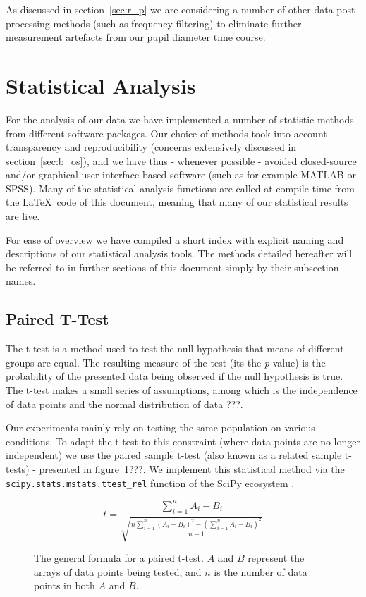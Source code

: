 	    As discussed in section~\ref{sec:r_p} we are considering a number of other data post-processing methods (such as frequency filtering) to eliminate further measurement artefacts from our pupil diameter time course. 
    \section{Statistical Analysis}\label{sec:m_sa}
	For the analysis of our data we have implemented a number of statistic methods from different software packages.
	Our choice of methods took into account transparency and reproducibility (concerns extensively discussed in section~\ref{sec:b_os}), and we have thus - whenever possible - avoided closed-source and/or graphical user interface based software (such as for example MATLAB\textsuperscript{\small\textregistered} or SPSS\textsuperscript{\small\textregistered}).
	Many of the statistical analysis functions are called at compile time from the \LaTeX\ code of this document, meaning that many of our statistical results are live.
	
	For ease of overview we have compiled a short index with explicit naming and descriptions of our statistical analysis tools.
	The methods detailed hereafter will be referred to in further sections of this document simply by their subsection names.
	\subsection{Paired T-Test}\label{sec:m_sa_rs}
	    The t-test is a method used to test the null hypothesis that means of different groups are equal.
	    The resulting measure of the test (its the \textit{p}-value) is the probability of the presented data being observed if the null hypothesis is true. 
	    The t-test makes a small series of assumptions, among which is the independence of data points and the normal distribution of data ???.
	    
	    Our experiments mainly rely on testing the same population on various conditions.
	    To adapt the t-test to this constraint (where data points are no longer independent) we use the paired sample t-test (also known as a related sample t-tests) - presented in figure~\ref{eq:m_sa_pt}???.
	    We implement this statistical method via the \colorbox{vlg}{\texttt{scipy.stats.mstats.ttest\_rel}} function of the SciPy ecosystem \cite{scipy,Oliphant2007}.

	    \begin{figure}[H]
		\[ t = \frac{\sum\limits_{i=1}^n A_{i}-B_{i}}{\sqrt{\frac{n \sum\limits_{i=1}^n (A_{i}-B_{i})^{2} - \left(\sum\limits_{i=1}^n A_{i}-B_{i}\right)^{2}}{n-1}}} \]
		\caption{The general formula for a paired t-test. $A$ and $B$ represent the arrays of data points being tested, and $n$ is the number of data points in both $A$ and $B$.}
		\label{eq:m_sa_pt}
	    \end{figure}
	    

